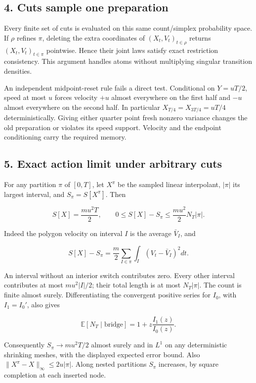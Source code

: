 \documentclass[11pt,a4paper]{article}
\begin{document}
\hypertarget{cuts-sample-one-preparation}{%
\subsection{4. Cuts sample one
preparation}\label{cuts-sample-one-preparation}}

Every finite set of cuts is evaluated on this same count/simplex
probability space. If \(\rho\) refines \(\pi\), deleting the extra
coordinates of \((X_t,V_t)_{t\in\rho}\) returns \((X_t,V_t)_{t\in\pi}\)
pointwise. Hence their joint laws satisfy exact restriction consistency.
This argument handles atoms without multiplying singular transition
densities.

An independent midpoint-reset rule fails a direct test. Conditional on
\(Y=uT/2\), speed at most \(u\) forces velocity \(+u\) almost everywhere
on the first half and \(-u\) almost everywhere on the second half. In
particular \(X_{T/4}=X_{3T/4}=uT/4\) deterministically. Giving either
quarter point fresh nonzero variance changes the old preparation or
violates its speed support. Velocity and the endpoint conditioning carry
the required memory.

\hypertarget{exact-action-limit-under-arbitrary-cuts}{%
\subsection{5. Exact action limit under arbitrary
cuts}\label{exact-action-limit-under-arbitrary-cuts}}

For any partition \(\pi\) of \([0,T]\), let \(X^\pi\) be the sampled
linear interpolant, \(|\pi|\) its largest interval, and
\(S_\pi=S[X^\pi]\). Then

\[S[X]=\frac{mu^2T}{2},\qquad
0\le S[X]-S_\pi\le\frac{mu^2}{2}N_T|\pi|.\]

Indeed the polygon velocity on interval \(I\) is the average
\(\bar V_I\), and

\[S[X]-S_\pi=\frac m2\sum_{I\in\pi}
                  \int_I(V_t-\bar V_I)^2dt.\]

An interval without an interior switch contributes zero. Every other
interval contributes at most \(mu^2|I|/2\); their total length is at
most \(N_T|\pi|\). The count is finite almost surely. Differentiating
the convergent positive series for \(I_0\), with \(I_1=I_0'\), also
gives

\[\mathbb E[N_T\mid\text{bridge}]
       =1+z\frac{I_1(z)}{I_0(z)}.\]

Consequently \(S_\pi\to mu^2T/2\) almost surely and in \(L^1\) on any
deterministic shrinking meshes, with the displayed expected error bound.
Also \(\|X^\pi-X\|_\infty\le2u|\pi|\). Along nested partitions \(S_\pi\)
increases, by square completion at each inserted node.
\end{document}
